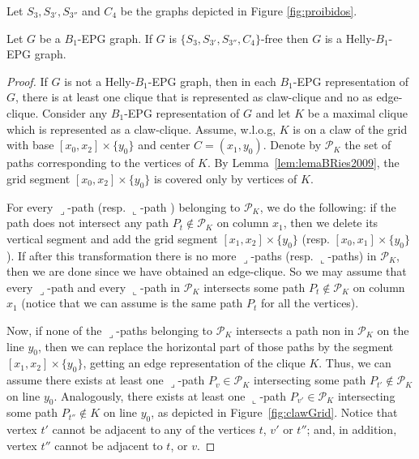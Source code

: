 \documentclass{dmgt}
\begin{document}
Let $S_{3}, S_{3'}, S_{3''}$ and $ C_{4}$ be the graphs depicted in Figure \ref{fig:proibidos}. 


\begin{theorem}
\label{lem:chordalDiamondFree}
Let $G$ be a $B_1$-EPG graph. If $G$ is  $\{S_{3}, S_{3'}, S_{3''}, C_{4}\}$-free then $G$  is a Helly-$B_1$-EPG graph.
\end{theorem}

\begin{proof}
If $G$ is not a Helly-$B_1$-EPG graph, then in each $B_1$-EPG representation of $G$, there is at least one clique that is represented as claw-clique and no as edge-clique. Consider any $B_1$-EPG  representation of $G$  and let $K$ be a maximal clique  which is represented as a claw-clique. Assume, w.l.o.g,  $K$ is on a claw of the grid with base $[x_0, x_2]\times\{y_0\}$ and center $C = (x_1, y_0)$. Denote by  $\mathcal{P}_K$ the set of paths corresponding to the vertices of $K$.  By Lemma~\ref{lem:lemaBRies2009},  %
the grid segment $[x_0, x_2]\times\{y_0\}$ is covered only by vertices of $K$. %


 For every ${\displaystyle \lrcorner}$-path %
 (resp. ${\displaystyle \llcorner}$-path 
 ) belonging to $\mathcal{P}_K$, we do the following: if %
 the path does not intersect any path $P_t \notin\mathcal{P}_K$ on column $x_1$, then we delete its vertical segment and add the grid segment $[x_1, x_2]\times\{y_0\}$ (resp. $[x_0, x_1]\times\{y_0\}$). If after this transformation there is no more ${\displaystyle \lrcorner}$-paths (resp. ${\displaystyle \llcorner}$-paths) in $\mathcal{P}_K$, then we are done since we have obtained an edge-clique. So we may assume that
 every ${\displaystyle \lrcorner}$-path   and every ${\displaystyle \llcorner}$-path  in $ \mathcal{P}_K$ intersects some path $P_t \notin \mathcal{P}_K$   on column $x_1$ (notice that we can assume is the same path $P_t$ for all the vertices). 
 
 Now, if none of the ${\displaystyle \lrcorner}$-paths belonging to $\mathcal{P}_K$ intersects  a path non in  $ \mathcal{P}_K$ on the line $y_0$, then we can replace the horizontal part of those paths by the segment $[x_1,x_2]\times \{y_0\}$, getting an edge representation of the clique $K$. Thus, we can assume there exists
 at least one ${\displaystyle \lrcorner}$-path $P_{v} \in \mathcal{P}_K$ intersecting some path  $P_{t'} \notin \mathcal{P}_K$ on line $y_0$. Analogously, there exists
 at least one ${\displaystyle \llcorner}$-path $P_{v'} \in \mathcal{P}_K$ intersecting some path  $P_{t''} \notin K$ on line $y_0$, as depicted in Figure~\ref{fig:clawGrid}. Notice that vertex $t'$ cannot be adjacent to any of the vertices $t$, $v'$ or $t''$; and, in addition, vertex $t''$ cannot
 be adjacent to   $t$,  or $v$.
 

\end{proof}
\end{document}
